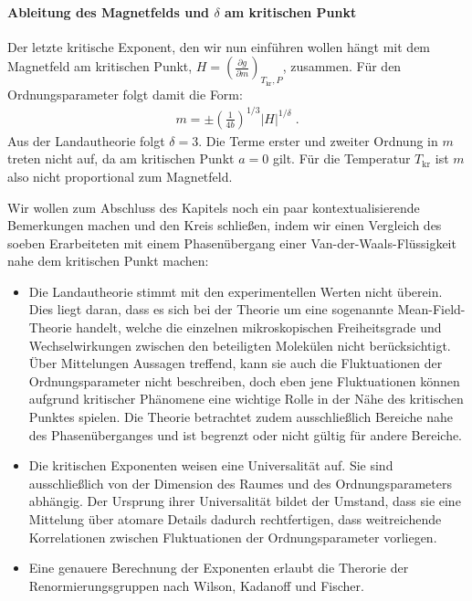 \paragraph*{Ableitung des Magnetfelds und $\delta$ am kritischen Punkt}
Der letzte kritische Exponent, den wir nun einführen wollen hängt mit dem Magnetfeld am kritischen Punkt, $H=\left(\frac{\partial g}{\partial m}\right)_{T_\mathrm{kr},P}$, zusammen. Für den Ordnungsparameter folgt damit die Form:
\begin{align*}
    \boxed{m=\pm \left(\frac{1}{4b}\right)^{1/3}|H|^{1/\delta}}\;.
\end{align*}
Aus der Landautheorie folgt $\delta=3$. Die Terme erster und zweiter Ordnung in $m$ treten nicht auf, da am kritischen Punkt $a=0$ gilt. Für die Temperatur $T_\mathrm{kr}$ ist $m$ also nicht proportional zum Magnetfeld.

Wir wollen zum Abschluss des Kapitels noch ein paar kontextualisierende Bemerkungen machen und den Kreis schließen, indem wir einen Vergleich des soeben Erarbeiteten mit einem Phasenübergang einer Van-der-Waals-Flüssigkeit nahe dem kritischen Punkt machen:
\begin{itemize}
    \item Die Landautheorie stimmt mit den experimentellen Werten nicht überein. Dies liegt daran, dass es sich bei der Theorie um eine sogenannte Mean-Field-Theorie handelt, welche die einzelnen mikroskopischen Freiheitsgrade und Wechselwirkungen zwischen den beteiligten Molekülen nicht berücksichtigt. Über Mittelungen Aussagen treffend, kann sie auch die Fluktuationen der Ordnungsparameter nicht beschreiben, doch eben jene Fluktuationen können aufgrund kritischer Phänomene eine wichtige Rolle in der Nähe des kritischen Punktes spielen. Die Theorie betrachtet zudem ausschließlich Bereiche nahe des Phasenüberganges und ist begrenzt oder nicht gültig für andere Bereiche.
    \item  Die kritischen Exponenten weisen eine Universalität auf. Sie sind ausschließlich von der Dimension des Raumes und des Ordnungsparameters abhängig. Der Ursprung ihrer Universalität bildet der Umstand, dass sie eine Mittelung über atomare Details dadurch rechtfertigen, dass weitreichende Korrelationen zwischen Fluktuationen der Ordnungsparameter vorliegen.
    \item Eine genauere Berechnung der Exponenten erlaubt die Therorie der Renormierungsgruppen nach Wilson, Kadanoff und Fischer.
\end{itemize}
